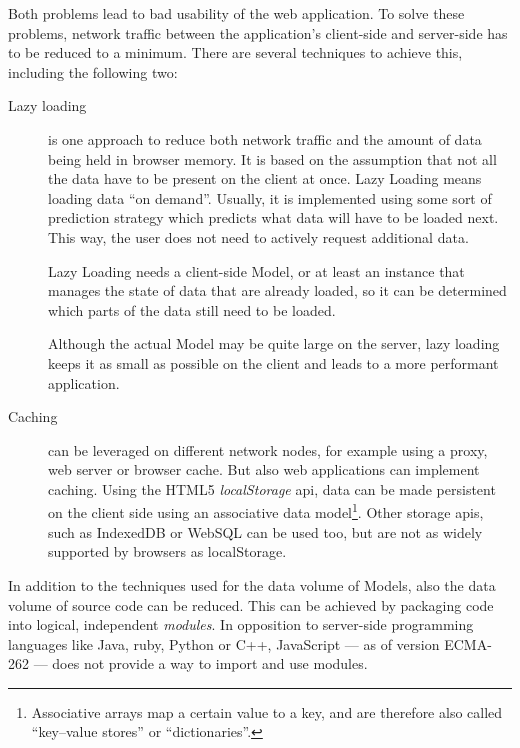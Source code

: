 Both problems lead to bad usability of the web application. To solve these problems, network traffic between the application's client-side and server-side has to be reduced to a minimum. There are several techniques to achieve this, including the following two:
\begin{description}
	\item[Lazy loading] is one approach to reduce both network traffic and the amount of data being held in browser memory. It is based on the assumption that not all the data have to be present on the client at once. Lazy Loading means loading data ``on demand''. Usually, it is implemented using some sort of prediction strategy which predicts what data will have to be loaded next. This way, the user does not need to actively request additional data.

	Lazy Loading needs a client-side Model, or at least an instance that manages the state of data that are already loaded, so it can be determined which parts of the data still need to be loaded.

	Although the actual Model may be quite large on the server, lazy loading keeps it as small as possible on the client and leads to a more performant application.
	\item[Caching] can be leveraged on different network nodes, for example using a proxy, web server or browser cache. But also web applications can implement caching. Using the HTML5 \emph{localStorage} \ac{api}, data can be made persistent on the client side using an associative data model\footnote{Associative arrays map a certain value to a key, and are therefore also called ``key--value stores'' or ``dictionaries''.}. Other storage \glspl{api}, such as IndexedDB or WebSQL can be used too, but are not as widely supported by browsers as localStorage.

\end{description}

In addition to the techniques used for the data volume of Models, also the data volume of source code can be reduced. This can be achieved by packaging code into logical, independent \emph{modules}. In opposition to server-side programming languages like Java, \gls{ruby}, Python or C++, JavaScript --- as of version ECMA-262 --- does not provide a way to import and use modules.

